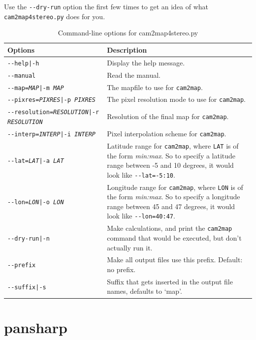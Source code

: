 Use the \texttt{-\/-dry-run} option the first few times to get an idea of what \texttt{cam2map4stereo.py} does for you.

\begin{longtable}{|l|p{10cm}|}
\caption{Command-line options for cam2map4stereo.py}
\label{tbl:bundlevis}
\endfirsthead
\endhead
\endfoot
\endlastfoot
\hline
Options & Description \\ \hline \hline
\texttt{-\/-help|-h} & Display the help message. \\ \hline
\texttt{-\/-manual} & Read the manual. \\ \hline
\texttt{-\/-map=\textit{MAP}|-m \textit{MAP}} & The mapfile to use for \texttt{cam2map}. \\ \hline
\texttt{-\/-pixres=\textit{PIXRES}|-p \textit{PIXRES}} & The pixel resolution mode to use for \texttt{cam2map}. \\ \hline
\texttt{-\/-resolution=\textit{RESOLUTION}|-r \textit{RESOLUTION}} & Resolution of the final map for \texttt{cam2map}. \\ \hline
\texttt{-\/-interp=\textit{INTERP}|-i \textit{INTERP}} & Pixel interpolation scheme for \texttt{cam2map}. \\ \hline
\texttt{-\/-lat=\textit{LAT}|-a \textit{LAT}} & Latitude range for \texttt{cam2map}, where \texttt{LAT} is of the form \textit{min:max}.  So to specify a latitude range between -5 and 10 degrees, it would look like \texttt{-\/-lat=-5:10}. \\ \hline
\texttt{-\/-lon=\textit{LON}|-o \textit{LON}} & Longitude range for \texttt{cam2map}, where \texttt{LON} is of the form \textit{min:max}.  So to specify a longitude range between 45 and 47 degrees, it would look like \texttt{-\/-lon=40:47}. \\ \hline
\texttt{-\/-dry-run|-n} & Make calculations, and print the \texttt{cam2map} command that would be executed, but don't actually run it.\\ \hline
\texttt{-\/-prefix} & Make all output files use this prefix. Default: no prefix.\\ \hline
\texttt{-\/-suffix|-s} & Suffix that gets inserted in the output file names, defaults to `map'.\\ \hline
\end{longtable}

\clearpage



\section{pansharp}
\label{pansharp}

